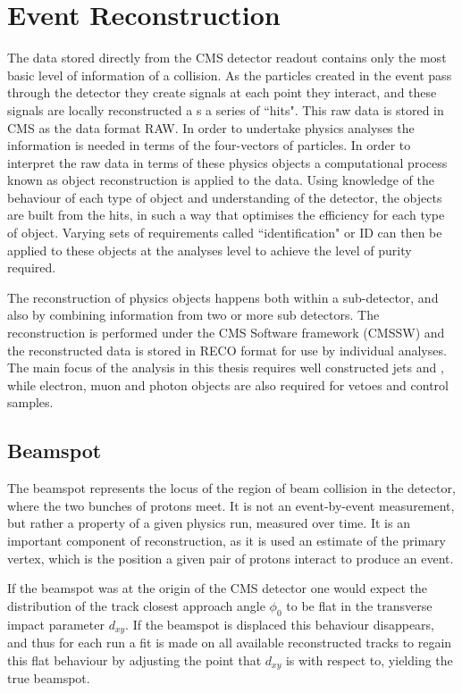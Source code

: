 \chapter{Event Reconstruction}

The data stored directly from the CMS detector readout contains only the most basic level of information of a collision. As the particles created in the event pass through the detector they create signals at each point they interact, and these signals are locally reconstructed a s a series of ``hits". This raw data is stored in CMS as the data format RAW. In order to undertake physics analyses the information is needed in terms of the four-vectors of particles. In order to interpret the raw data in terms of these physics objects a computational process known as object reconstruction is applied to the data. Using knowledge of the behaviour of each type of object and understanding of the detector, the objects are built from the hits, in such a way that optimises the efficiency for each type of object. Varying sets of requirements called ``identification" or ID can then be applied to these objects at the analyses level to achieve the level of purity required. 

The reconstruction of physics objects happens both within a sub-detector, and also by combining information from two or more sub detectors. The reconstruction is performed under the CMS Software framework (CMSSW) and the reconstructed data is stored in RECO format for use by individual analyses. The main focus of the analysis in this thesis requires well constructed jets and \met, while electron, muon and photon objects are also required for vetoes and control samples. 

\section{Beamspot}

The beamspot represents the locus of the region of beam collision in the detector, where the two bunches of protons meet. It is not an event-by-event measurement, but rather a property of a given physics run, measured over time. It is an important component of reconstruction, as it is used an estimate of the primary vertex, which is the position a given pair of  protons interact to produce an event.

 If the beamspot was at the origin of the CMS detector one would expect the distribution of the track closest approach angle $\phi_{0}$ to be flat in the transverse impact parameter $d_{xy}$. If the beamspot is displaced this behaviour disappears, and thus for each run a fit is made on all available reconstructed tracks to regain this flat behaviour by adjusting the point that $d_{xy}$ is with respect to, yielding the true beamspot. 
 
